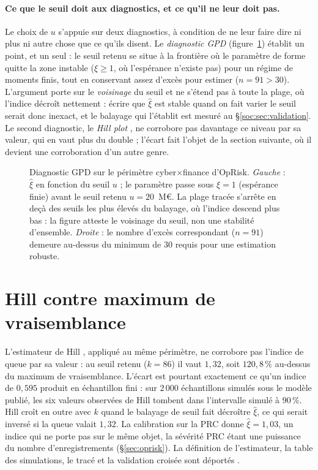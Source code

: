 \paragraph{Ce que le seuil doit aux diagnostics, et ce qu'il ne leur doit pas.} Le choix de $u$
s'appuie sur deux diagnostics, à condition de ne leur faire dire ni plus ni autre chose que ce
qu'ils disent. Le \emph{diagnostic GPD} (figure~\ref{soc:fig:diagnostic-gpd}) établit un point,
et un seul : le seuil retenu se situe à la frontière où le paramètre de forme quitte la zone
instable ($\xi \geq 1$, où l'espérance n'existe pas) pour un régime de moments finis, tout en
conservant assez d'excès pour estimer ($n = 91 > 30$). L'argument porte sur le \emph{voisinage}
du seuil et ne s'étend pas à toute la plage, où l'indice décroît nettement : écrire que
$\hat\xi$ est stable quand on fait varier le seuil serait donc inexact, et le balayage qui
l'établit est mesuré au \S\ref{soc:sec:validation}. Le second diagnostic, le \emph{Hill plot}
\matcomp, ne corrobore pas davantage ce niveau par sa valeur, qui en vaut plus du double ;
l'écart fait l'objet de la section suivante, où il devient une corroboration d'un autre genre.

\begin{figure}[htbp]
\centering
{}
\caption{Diagnostic GPD sur le périmètre cyber$\times$finance d'OpRisk.
\emph{Gauche} : $\hat{\xi}$ en fonction du seuil $u$ ; le paramètre passe sous
$\xi = 1$ (espérance finie) avant le seuil retenu $u = 20$~M\euro. La plage tracée
s'arrête en deçà des seuils les plus élevés du balayage, où l'indice descend plus bas :
la figure atteste le voisinage du seuil, non une stabilité d'ensemble.
\emph{Droite} : le nombre d'excès correspondant ($n = 91$) demeure au-dessus du
minimum de $30$ requis pour une estimation robuste.}
\label{soc:fig:diagnostic-gpd}
\end{figure}

\section{Hill contre maximum de vraisemblance}


L'estimateur de Hill \citep{Hill1975}, appliqué au même périmètre, ne corrobore pas l'indice de
queue par sa valeur : au seuil retenu ($k=86$) il vaut $1{,}32$, soit $120{,}8\,\%$ au-dessus du
maximum de vraisemblance. L'écart est pourtant exactement ce qu'un indice de $0{,}595$ produit en
échantillon fini : sur $2\,000$ échantillons simulés sous le modèle publié, les six valeurs
observées de Hill tombent dans l'intervalle simulé à $90\,\%$. Hill croît en outre avec $k$ quand
le balayage de seuil fait décroître $\hat\xi$, ce qui serait inversé si la queue valait $1{,}32$.
La calibration sur la PRC donne $\hat\xi = 1{,}03$, un indice qui ne porte pas sur le même
objet, la sévérité PRC étant une puissance du nombre d'enregistrements (\S\ref{sec:oprisk}). La
définition de l'estimateur, la table des simulations, le tracé et la validation croisée sont
déportés \matcomp.

